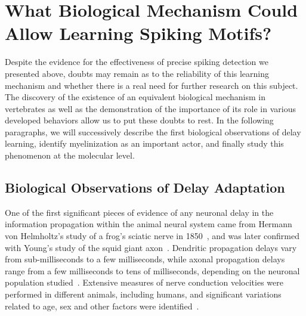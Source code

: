 \documentclass[brainsci, %
               review,accept,pdftex,moreauthors
               ]{Definitions/mdpi}
\begin{document}
\section{What Biological Mechanism Could Allow Learning Spiking Motifs?}
%
Despite the evidence for the effectiveness of precise spiking detection we presented above, doubts may remain as to the reliability of this learning mechanism and whether there is a real need for further research on this subject. The discovery of the existence of an equivalent biological mechanism in vertebrates as well as the demonstration of the importance of its role in various developed behaviors allow us to put these doubts to rest. In the following paragraphs, we will successively describe the first biological observations of delay learning, identify myelinization as an important actor, and finally study this phenomenon at the molecular level. 

\subsection{Biological Observations of Delay Adaptation}

One of the first significant pieces of evidence of any neuronal delay in the information propagation within the animal neural system came from Hermann von Helmholtz's study of a frog's sciatic nerve in 1850~\citep{von_helmholz_messungen_1850,peyrard_how_2020}, and was later confirmed with Young's study of the squid giant axon~\citep{young_functioning_1938}. Dendritic propagation delays vary from sub-milliseconds to a few milliseconds, while axonal propagation delays range from a few milliseconds to tens of milliseconds, depending on the neuronal population studied~\citep{madadi_asl_dendritic_2018}. Extensive measures of nerve conduction velocities were performed in different animals, including humans, and significant variations related to age, sex and other factors were identified~\citep{stetson_effects_1992}.
\end{document}
